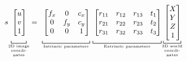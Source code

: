 \documentclass[12pt, a4paper, twocolumn]{article}
\newcommand\scalemath[2]{\scalebox{#1}{\mbox{\ensuremath{\displaystyle #2}}}}
\begin{document}
\[
\scalemath{0.9}{
    s
    {\underbracket[0.6pt]{
        \vphantom{\begin{bmatrix}.\\.\\.\\.\end{bmatrix}}%
        \begin{bmatrix}%
            u\\v\\1%
        \end{bmatrix}%
    }_{\parbox{1cm}{\centering\tiny 2D image coordinates}}}
    = 
    {\underbracket[0.6pt]{%
        \vphantom{\begin{bmatrix}.\\.\\.\\.\end{bmatrix}}%
        \begin{bmatrix}%
            f_x & 0 & c_x\\%
            0 & f_y & c_y\\%
            0 & 0 & 1\\%
        \end{bmatrix}%
    }_{\parbox{2.5cm}{\centering\tiny Intrinsic parameters}}}
    {\underbracket[0.6pt]{%
        \vphantom{\begin{bmatrix}.\\.\\.\\.\end{bmatrix}}%
        \begin{bmatrix}%
            r_{11} & r_{12} & r_{13} & t_1\\%
            r_{21} & r_{22} & r_{23} & t_2\\%
            r_{31} & r_{32} & r_{33} & t_3\\%
        \end{bmatrix}%
    }_{\parbox{3cm}{\centering\tiny Extrinsic parameters}}}
    {\underbracket[0.6pt]{%
        \vphantom{\begin{bmatrix}.\\.\\.\\.\end{bmatrix}}%
        \begin{bmatrix}%
            X\\Y\\Z\\1%
        \end{bmatrix}%
    }_{\parbox{1cm}{\centering\tiny 3D world coordinates}}}
}
\]
\end{document}
